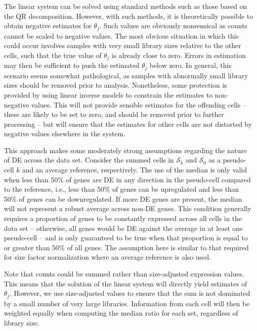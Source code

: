 \documentclass{article}
\begin{document}
The linear system can be solved using standard methods such as those based on the QR decomposition.
However, with such methods, it is theoretically possible to obtain negative estimates for $\theta_j$.
Such values are obviously nonsensical as counts cannot be scaled to negative values.
The most obvious situation in which this could occur involves samples with very small library sizes relative to the other cells, 
    such that the true value of $\theta_j$ is already close to zero.
Errors in estimation may then be sufficient to push the estimated $\theta_j$ below zero.
In general, this scenario seems somewhat pathological, as samples with abnormally small library sizes should be removed prior to analysis.
Nonetheless, some protection is provided by using linear inverse models \cite{soetaert2009limsolve} to constrain the estimates to non-negative values.
This will not provide sensible estimates for the offending cells -- these are likely to be set to zero, and should be removed prior to further processing --
    but will ensure that the estimates for other cells are not distorted by negative values elsewhere in the system.
    
This approach makes some moderately strong assumptions regarding the nature of DE across the data set.
Consider the summed cells in $\mathcal{S}_k$ and $\mathcal{S}_0$ as a pseudo-cell $k$ and an average reference, respectively.
The use of the median is only valid when less than 50\% of genes are DE in any direction in the pseudo-cell compared to the reference,
    i.e., less than 50\% of genes can be upregulated and less than 50\% of genes can be downregulated.
If more DE genes are present, the median will not represent a robust average across non-DE genes.
This condition generally requires a proportion of genes to be constantly expressed across all cells in the data set 
    -- otherwise, all genes would be DE against the average in at least one pseudo-cell -- 
    and is only guaranteed to be true when that proportion is equal to or greater than 50\% of all genes.
The assumption here is similar to that required for size factor normalization where an average reference is also used.

Note that counts could be summed rather than size-adjusted expression values.
This means that the solution of the linear system will directly yield estimates of $\theta_j$.
However, we use size-adjusted values to ensure that the sum is not dominated by a small number of very large libraries.
Information from each cell will then be weighted equally when computing the median ratio for each set, regardless of library size.
\end{document}
